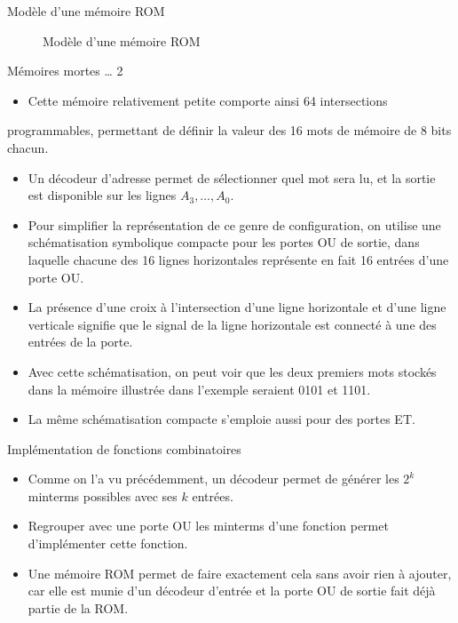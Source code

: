 \documentclass[presentation]{beamer}
\begin{document}
\begin{frame}[label={sec:org07f294c}]{Modèle d'une mémoire ROM}
\begin{figure}[htbp]
\centering

\caption{\label{fig:org75ec378}Modèle d'une mémoire ROM}
\end{figure}
\end{frame}


\begin{frame}[label={sec:org9af970d}]{Mémoires mortes \ldots{} 2}
\begin{itemize}
\item Cette mémoire relativement petite comporte ainsi 64 intersections
\end{itemize}
programmables, permettant de définir la valeur des 16 mots de mémoire de 8 bits chacun.

\begin{itemize}
\item Un décodeur d'adresse permet de sélectionner quel mot sera lu, et la sortie est disponible sur les lignes \(A_3, \ldots, A_0\).

\item Pour simplifier la représentation de ce genre de configuration, on utilise une schématisation symbolique compacte pour les portes OU de sortie, dans laquelle chacune des 16 lignes horizontales représente en fait 16 entrées d'une porte OU.

\item La présence d'une croix à l'intersection d'une ligne horizontale et d'une ligne verticale signifie que le signal de la ligne horizontale est connecté à une des entrées de la porte.

\item Avec cette schématisation, on peut voir que les deux premiers mots stockés dans la mémoire illustrée dans l'exemple seraient 0101 et 1101.

\item La même schématisation compacte s'emploie aussi pour des portes ET.
\end{itemize}
\end{frame}

\begin{frame}[label={sec:orgc90cd1a}]{Implémentation de fonctions combinatoires}
\begin{itemize}
\item Comme on l'a vu précédemment, un décodeur permet de générer les \(2^k\) minterms possibles avec ses \(k\) entrées.

\item Regrouper avec une porte OU les minterms d'une fonction permet d'implémenter cette fonction.

\item Une mémoire ROM permet de faire exactement cela sans avoir rien à ajouter, car elle est munie d'un décodeur d'entrée et la porte OU de sortie fait déjà partie de la ROM.
\end{itemize}
\end{frame}
\end{document}
